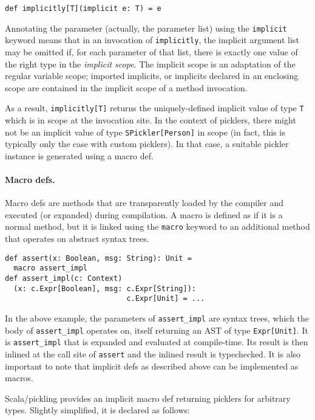 \begin{lstlisting}
def implicitly[T](implicit e: T) = e
\end{lstlisting}
\noindent
Annotating the parameter (actually, the parameter list) using the
\verb|implicit| keyword means that in an invocation of \verb|implicitly|, the
implicit argument list may be omitted if, for each parameter of that list,
there is exactly one value of the right type in the {\em implicit scope}. The
implicit scope is an adaptation of the regular variable scope; imported
implicits, or implicits declared in an enclosing scope are contained in the
implicit scope of a method invocation.

As a result, \verb|implicitly[T]| returns the uniquely-defined implicit value
of type \verb|T| which is in scope at the invocation site. In the context of
picklers, there might not be an implicit value of type \verb|SPickler[Person]|
in scope (in fact, this is typically only the case with custom picklers). In
that case, a suitable pickler instance is generated using a macro def.

\paragraph{Macro defs.} Macro defs are methods that are transparently loaded
by the compiler and executed (or expanded) during compilation. A macro is
defined as if it is a normal method, but it is linked using the \verb|macro|
keyword to an additional method that operates on abstract syntax trees.

\begin{lstlisting}
def assert(x: Boolean, msg: String): Unit =
  macro assert_impl
def assert_impl(c: Context)
  (x: c.Expr[Boolean], msg: c.Expr[String]):
                            c.Expr[Unit] = ...
\end{lstlisting}

In the above example, the parameters of \verb|assert_impl| are syntax trees,
which the body of \verb|assert_impl| operates on, itself returning an AST
of type \verb|Expr[Unit]|. It is \verb|assert_impl| that is expanded and
evaluated at compile-time. Its result is then inlined at the call site of
\verb|assert| and the inlined result is typechecked. It is also important to
note that implicit defs as described above can be implemented as macros.

Scala/pickling provides an implicit macro def returning picklers for arbitrary
types. Slightly simplified, it is declared as follows:

